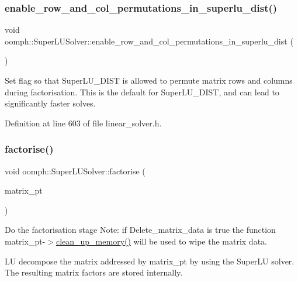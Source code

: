 \subsubsection{\texorpdfstring{enable\+\_\+row\+\_\+and\+\_\+col\+\_\+permutations\+\_\+in\+\_\+superlu\+\_\+dist()}{enable\_row\_and\_col\_permutations\_in\_superlu\_dist()}}
{\footnotesize\ttfamily void oomph\+::\+Super\+L\+U\+Solver\+::enable\+\_\+row\+\_\+and\+\_\+col\+\_\+permutations\+\_\+in\+\_\+superlu\+\_\+dist (\begin{DoxyParamCaption}{ }\end{DoxyParamCaption})\hspace{0.3cm}{\ttfamily [inline]}}



Set flag so that Super\+L\+U\+\_\+\+D\+I\+ST is allowed to permute matrix rows and columns during factorisation. This is the default for Super\+L\+U\+\_\+\+D\+I\+ST, and can lead to significantly faster solves. 



Definition at line 603 of file linear\+\_\+solver.\+h.

\mbox{\label{classoomph_1_1SuperLUSolver_a67d7a06fdff48c75736498c7b853d781}} 
\subsubsection{\texorpdfstring{factorise()}{factorise()}}
{\footnotesize\ttfamily void oomph\+::\+Super\+L\+U\+Solver\+::factorise (\begin{DoxyParamCaption}\item[{\hyperlink{classoomph_1_1DoubleMatrixBase}{Double\+Matrix\+Base} $\ast$const \&}]{matrix\+\_\+pt }\end{DoxyParamCaption})}



Do the factorisation stage Note\+: if Delete\+\_\+matrix\+\_\+data is true the function matrix\+\_\+pt-\/$>$\hyperlink{classoomph_1_1SuperLUSolver_aec78b96a8f831a89f9b8fb48b1ce0c68}{clean\+\_\+up\+\_\+memory()} will be used to wipe the matrix data. 

LU decompose the matrix addressed by matrix\+\_\+pt by using the Super\+LU solver. The resulting matrix factors are stored internally. 

